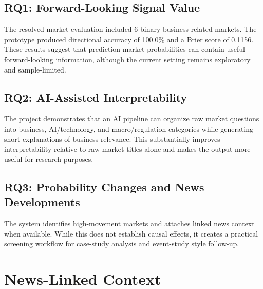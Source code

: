 \documentclass[12pt]{article}
\begin{document}
\subsection{RQ1: Forward-Looking Signal Value}

The resolved-market evaluation included 6 binary business-related markets. The prototype produced directional accuracy of 100.0\% and a Brier score of 0.1156. These results suggest that prediction-market probabilities can contain useful forward-looking information, although the current setting remains exploratory and sample-limited.

\subsection{RQ2: AI-Assisted Interpretability}

The project demonstrates that an AI pipeline can organize raw market questions into business, AI/technology, and macro/regulation categories while generating short explanations of business relevance. This substantially improves interpretability relative to raw market titles alone and makes the output more useful for research purposes.

\subsection{RQ3: Probability Changes and News Developments}

The system identifies high-movement markets and attaches linked news context when available. While this does not establish causal effects, it creates a practical screening workflow for case-study analysis and event-study style follow-up.

\section{News-Linked Context}
\end{document}
